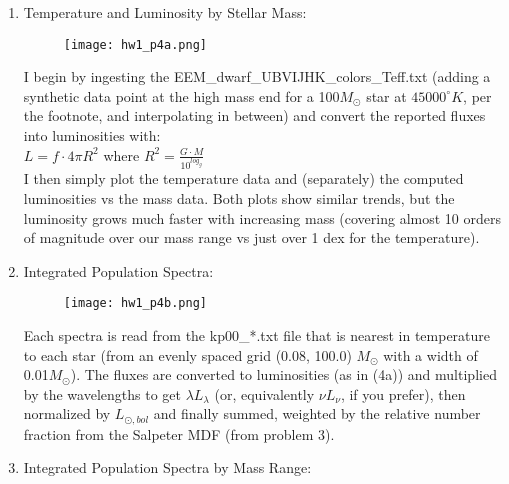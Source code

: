\documentclass[11pt]{article}
\begin{document}
\begin{enumerate}
    \begin{enumerate}
  	  \item %
  	  Temperature and Luminosity by Stellar Mass:
  	  
		  \begin{figure}[H]
	  		\texttt{[image: hw1\_p4a.png]}
	  		\label{fig:fig7}
		  \end{figure}
		  
	I begin by ingesting the EEM\_dwarf\_UBVIJHK\_colors\_Teff.txt (adding a synthetic data point at the high mass end for a 100$M_{\odot}$ star at $45000^{\circ} K$, per the footnote, and interpolating in between) and convert the reported fluxes into luminosities with:\\
	
		 \hspace{10mm} $L = f \cdot 4\pi R^2$ \hspace{5mm} where $R^2 = \frac{\displaystyle G \cdot M} {\displaystyle 10^{log_g}}$\\
		 
	I then simply plot the temperature data and (separately) the computed luminosities vs the mass data. Both plots show similar trends, but the luminosity grows much faster with increasing mass (covering almost 10 orders of magnitude over our mass range vs just over 1 dex for the temperature).\\

\newpage 		  
		  
	\item %
	  	  Integrated Population Spectra:
	  	  
		  \begin{figure}[H]
			  		\texttt{[image: hw1\_p4b.png]}
			  		\label{fig:fig8}
		  \end{figure}
		  
	Each spectra is read from the kp00\_*.txt file that is nearest in temperature to each star (from an evenly spaced grid (0.08, 100.0) $M_{\odot}$ with a width of 0.01$M_{\odot}$). The fluxes are converted to luminosities (as in (4a)) and multiplied by the wavelengths to get $\lambda L_{\lambda}$ (or, equivalently $\nu L_{\nu}$, if you prefer), then normalized by $L_{\odot, bol}$ and finally summed, weighted by the relative number fraction from the Salpeter MDF (from problem 3).\\
	
		  
\newpage 		  
  	\item %
 	  Integrated Population Spectra by Mass Range:
 	  

\end{enumerate}
\end{enumerate}
\end{document}
